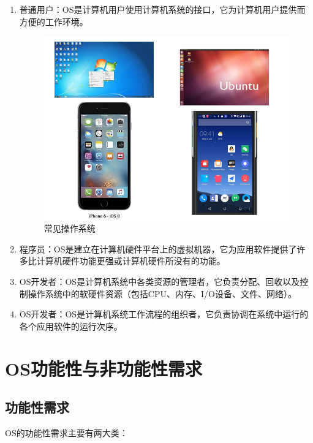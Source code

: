 \begin{enumerate}
	\item 普通用户：OS是计算机用户使用计算机系统的接口，它为计算机用户提供而方便的工作环境。
	      \begin{figure}[H]
		      \centering
		      \includegraphics[scale=0.7]{img/C1/1-1/3.png}
		      \caption{常见操作系统}
	      \end{figure}

	\item 程序员：OS是建立在计算机硬件平台上的虚拟机器，它为应用软件提供了许多比计算机硬件功能更强或计算机硬件所没有的功能。

	\item OS开发者：OS是计算机系统中各类资源的管理者，它负责分配、回收以及控制操作系统中的软硬件资源（包括CPU、内存、I/O设备、文件、网络）。

	\item OS开发者：OS是计算机系统工作流程的组织者，它负责协调在系统中运行的各个应用软件的运行次序。
\end{enumerate}

\newpage

\section{OS功能性与非功能性需求}

\subsection{功能性需求}

OS的功能性需求主要有两大类：

